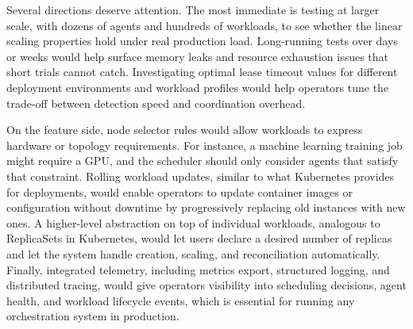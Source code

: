 Several directions deserve attention. The most immediate is testing at larger scale, with dozens of agents and hundreds of workloads, to see whether the linear scaling properties hold under real production load. Long-running tests over days or weeks would help surface memory leaks and resource exhaustion issues that short trials cannot catch. Investigating optimal lease timeout values for different deployment environments and workload profiles would help operators tune the trade-off between detection speed and coordination overhead.

On the feature side, node selector rules would allow workloads to express hardware or topology requirements. For instance, a machine learning training job might require a GPU, and the scheduler should only consider agents that satisfy that constraint. Rolling workload updates, similar to what Kubernetes provides for deployments, would enable operators to update container images or configuration without downtime by progressively replacing old instances with new ones. A higher-level abstraction on top of individual workloads, analogous to ReplicaSets in Kubernetes, would let users declare a desired number of replicas and let the system handle creation, scaling, and reconciliation automatically. Finally, integrated telemetry, including metrics export, structured logging, and distributed tracing, would give operators visibility into scheduling decisions, agent health, and workload lifecycle events, which is essential for running any orchestration system in production.

